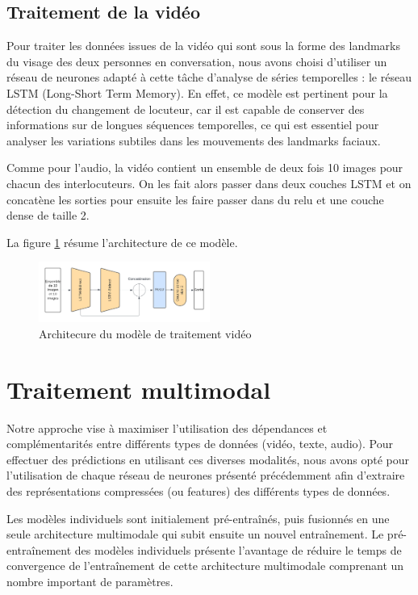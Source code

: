 \documentclass[a4paper]{article}
\begin{document}
\subsection{Traitement de la vidéo}

Pour traiter les données issues de la vidéo qui sont sous la forme des landmarks du visage des deux personnes en conversation, nous avons choisi d'utiliser un réseau de neurones adapté à cette tâche d'analyse de séries temporelles : le réseau LSTM (Long-Short Term Memory). En effet, ce modèle est pertinent pour la détection du changement de locuteur, car il est capable de conserver des informations sur de longues séquences temporelles, ce qui est essentiel pour analyser les variations subtiles dans les mouvements des landmarks faciaux. 

Comme pour l'audio, la vidéo contient un ensemble de deux fois 10 images pour chacun des interlocuteurs. On les fait alors passer dans deux couches LSTM et on concatène les sorties pour ensuite les faire passer dans du relu et une couche dense de taille 2.

La figure \ref{fig: model_video} résume l'architecture de ce modèle.

\begin{figure}[H]
    \centering
    \includegraphics[width=0.5\textwidth]{Traitement_video_SAM.png}
    \caption{Architecure du modèle de traitement vidéo}
    \label{fig: model_video}
\end{figure}

\section{Traitement multimodal}

Notre approche vise à maximiser l'utilisation des dépendances et complémentarités entre différents types de données (vidéo, texte, audio). Pour effectuer des prédictions en utilisant ces diverses modalités, nous avons opté pour l'utilisation de chaque réseau de neurones présenté précédemment afin d'extraire des représentations compressées (ou features) des différents types de données. 

Les modèles individuels sont initialement pré-entraînés, puis fusionnés en une seule architecture multimodale qui subit ensuite un nouvel entraînement. Le pré-entraînement des modèles individuels présente l'avantage de réduire le temps de convergence de l'entraînement de cette architecture multimodale comprenant un nombre important de paramètres.
\end{document}
